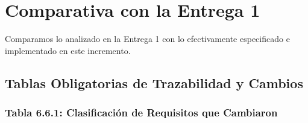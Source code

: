 \documentclass[11pt,letterpaper]{article}
\begin{document}
\section{Comparativa con la Entrega 1}

Comparamos lo analizado en la Entrega 1 con lo efectivamente especificado e implementado en este incremento.

\subsection{Tablas Obligatorias de Trazabilidad y Cambios}

\subsubsection{Tabla 6.6.1: Clasificación de Requisitos que Cambiaron}
\end{document}
